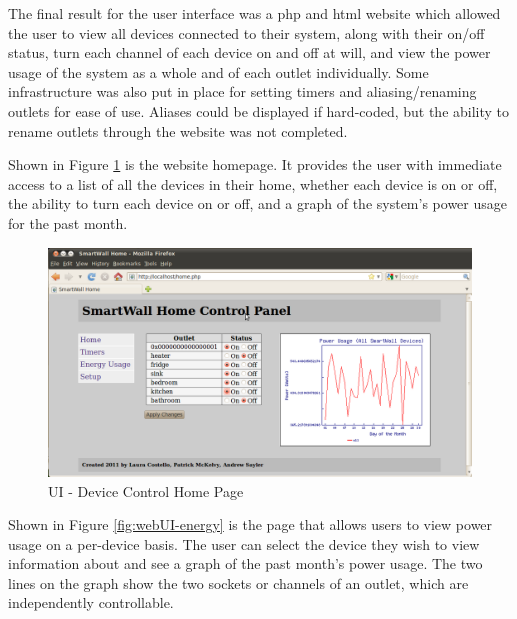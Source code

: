 \documentclass[12pt]{article}
\begin{document}
The final result for the user interface was a php and html website
which allowed the user to view all devices connected to their system,
along with their on/off status, turn each channel of each device on
and off at will, and view the power usage of the system as a whole
and of each outlet individually. Some infrastructure was also put in
place for setting timers and aliasing/renaming outlets for ease of
use. Aliases could be displayed if hard-coded, but the ability to
rename outlets through the website was not completed.

Shown in Figure \ref{fig:webUI-home} is the website homepage. It provides the
user with immediate access to a list of all the devices in their
home, whether each device is on or off, the ability to turn each
device on or off, and a graph of the system’s power usage for the
past month. 

\begin{figure}
  \begin{center}
    \includegraphics[scale=.3]{webUI-home.png}
  \end{center}
  \caption{UI - Device Control Home Page}
  \label{fig:webUI-home}
\end{figure}

Shown in Figure \ref{fig:webUI-energy} is the page that allows users
to view power usage on
a per-device basis. The user can select the device they wish to
view information about and see a graph of the past month’s power
usage. The two lines on the graph show the two sockets or
channels of an outlet, which are independently controllable. 
\end{document}
